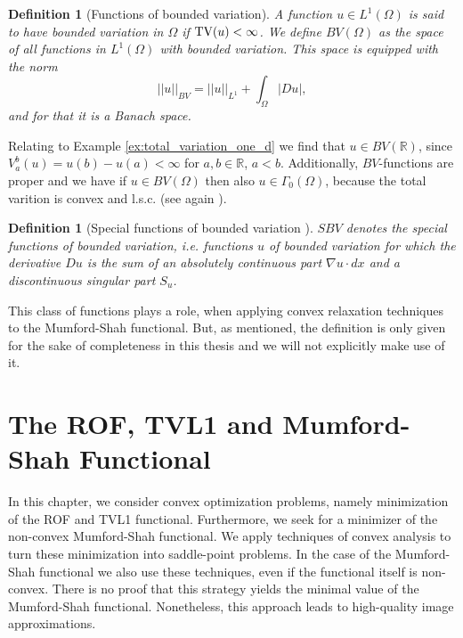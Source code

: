 \documentclass[abstracton]{scrreprt}
\newtheorem{definition}[theorem]{Definition}
\begin{document}
        \begin{definition}[Functions of bounded variation]
        \label{def:functions_of_bounded_variation}
            A function $u \in L^{1}(\Omega)$ is said to have bounded variation in $\Omega$ if $\textnormal{TV}(u) < \infty$. We define $BV(\Omega)$ as the space of all functions in $L^{1}(\Omega)$ with bounded variation. This space is equipped with the norm
                $$
                    ||u||_{BV} = ||u||_{L^{1}} + \int_{\Omega} |Du|,
                $$
            and for that it is a Banach space.
        \end{definition}
        Relating to Example \ref{ex:total_variation_one_d} we find that $u \in BV(\mathbb{R})$, since $V^{b}_{a}(u) = u(b) - u(a) < \infty$ for $a, b \in \mathbb{R}$, $a < b$.
        Additionally, $BV$-functions are proper and we have if $u \in BV(\Omega)$ then also $u \in \Gamma_{0}(\Omega)$, because the total varition is convex and l.s.c. (see again \cite{Chambolle-et-al-10}).
        \begin{definition}[Special functions of bounded variation \cite{Pock-et-al-iccv09}]
            $SBV$ denotes the special functions of bounded variation, i.e. functions $u$ of bounded variation for which the derivative $Du$ is the sum of an absolutely continuous part $\nabla u \cdot dx$ and a discontinuous singular part $S_{u}$.
        \end{definition}
        This class of functions plays a role, when applying convex relaxation techniques to the Mumford-Shah functional. But, as mentioned, the definition is only given for the sake of completeness in this thesis and we will not explicitly make use of it.



\chapter{The ROF, TVL1 and Mumford-Shah Functional} %
\label{cha:the_rof_tvl1_and_mumford_shah_functional}

    In this chapter, we consider convex optimization problems, namely minimization of the ROF and TVL1 functional. Furthermore, we seek for a minimizer of the non-convex Mumford-Shah functional. We apply techniques of convex analysis to turn these minimization into saddle-point problems. In the case of the Mumford-Shah functional we also use these techniques, even if the functional itself is non-convex. There is no proof that this strategy yields the minimal value of the Mumford-Shah functional. Nonetheless, this approach leads to high-quality image approximations.
\end{document}
